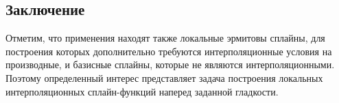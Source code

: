 \subsection{Заключение}
Отметим, что применения находят также локальные эрмитовы сплайны,
для построения которых
дополнительно требуются интерполяционные условия на производные,
и базисные сплайны, которые не являются интерполяционными.
Поэтому определенный интерес представляет задача построения локальных
интерполяционных сплайн-функций наперед заданной гладкости.




































